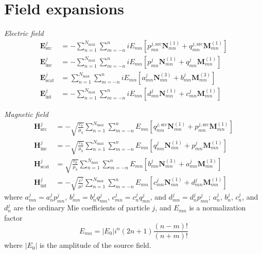 \documentclass[11pt]{article}
\begin{document}
\section{Field expansions}
\textit{Electric field}
\begin{align}
    \boldsymbol{E}_\text{src}^j &= - \sum_{n=1}^{N_\text{max}} \sum_{m=-n}^{n}
    iE_{mn} \left[ p_{mn}^{j,\text{src}} \boldsymbol{N}_{mn}^{(1)} + q_{mn}^{j,\text{src}} \boldsymbol{M}_{mn}^{(1)} \right] \\
    \boldsymbol{E}_\text{inc}^j &= - \sum_{n=1}^{N_\text{max}} \sum_{m=-n}^{n}
    iE_{mn} \left[ p_{mn}^j \boldsymbol{N}_{mn}^{(1)} + q_{mn}^j \boldsymbol{M}_{mn}^{(1)} \right] \\
    \boldsymbol{E}_\text{scat}^j &= \sum_{n=1}^{N_\text{max}} \sum_{m=-n}^{n}
    iE_{mn} \left[a_{mn}^j \boldsymbol{N}_{mn}^{(3)} + b_{mn}^j \boldsymbol{M}_{mn}^{(3)} \right] \\
    \boldsymbol{E}_\text{int}^j &= - \sum_{n=1}^{N_\text{max}} \sum_{m=-n}^{n}
    iE_{mn} \left[ d_{mn}^j \boldsymbol{N}_{mn}^{(1)} + c_{mn}^j \boldsymbol{M}_{mn}^{(1)} \right]
\end{align}

\textit{Magnetic field}
\begin{align}
    \boldsymbol{H}_\text{src}^j &= - \sqrt{\frac{\varepsilon_b}{\mu_b}} \sum_{n=1}^{N_\text{max}} \sum_{m=-n}^{n}
    E_{mn} \left[ q_{mn}^{j,\text{src}} \boldsymbol{N}_{mn}^{(1)} + p_{mn}^{j,\text{src}} \boldsymbol{M}_{mn}^{(1)} \right] \\
    \boldsymbol{H}_\text{inc}^j &= - \sqrt{\frac{\varepsilon_b}{\mu_b}} \sum_{n=1}^{N_\text{max}} \sum_{m=-n}^{n}
    E_{mn} \left[ q_{mn}^j \boldsymbol{N}_{mn}^{(1)} + p_{mn}^j \boldsymbol{M}_{mn}^{(1)} \right] \\
    \boldsymbol{H}_\text{scat}^j &= \sqrt{\frac{\varepsilon_b}{\mu_b}} \sum_{n=1}^{N_\text{max}} \sum_{m=-n}^{n}
    E_{mn} \left[b_{mn}^j \boldsymbol{N}_{mn}^{(3)} + a_{mn}^j \boldsymbol{M}_{mn}^{(3)} \right] \\
    \boldsymbol{H}_\text{int}^j &= -\sqrt{\frac{\varepsilon^j}{\mu^j}}  \sum_{n=1}^{N_\text{max}} \sum_{m=-n}^{n}
    E_{mn} \left[ c_{mn}^j \boldsymbol{N}_{mn}^{(1)} + d_{mn}^j \boldsymbol{M}_{mn}^{(1)} \right]
\end{align}
where $a_{mn}^j = a_n^j p_{mn}^j$, $b_{mn}^j = b_n^j q_{mn}^j$, $c_{mn}^j = c_n^j q_{mn}^j$, and $d_{mn}^j = d_n^j p_{mn}^j$; $a_n^j$, $b_n^j$, $c_n^j$, and $d_n^j$ are the ordinary Mie coefficients \cite{bohren2008absorption} of particle $j$, and $E_{mn}$ is a normalization factor
\begin{equation}
    E_{mn} = |E_0|i^n (2n+1) \frac{(n-m)!}{(n+m)!}
\end{equation}
where $|E_0|$ is the amplitude of the source field.
\end{document}
